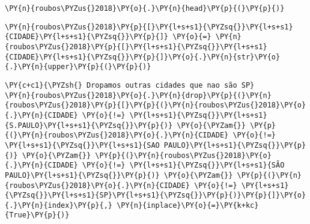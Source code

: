     \begin{tcolorbox}[breakable, size=fbox, boxrule=1pt, pad at break*=1mm,colback=cellbackground, colframe=cellborder]
\begin{Verbatim}[commandchars=\\\{\}]
\PY{n}{roubos\PYZus{}2018}\PY{o}{.}\PY{n}{head}\PY{p}{(}\PY{p}{)}
\end{Verbatim}
\end{tcolorbox}

    \begin{tcolorbox}[breakable, size=fbox, boxrule=1pt, pad at break*=1mm,colback=cellbackground, colframe=cellborder]
\begin{Verbatim}[commandchars=\\\{\}]
\PY{n}{roubos\PYZus{}2018}\PY{p}{[}\PY{l+s+s1}{\PYZsq{}}\PY{l+s+s1}{CIDADE}\PY{l+s+s1}{\PYZsq{}}\PY{p}{]} \PY{o}{=} \PY{n}{roubos\PYZus{}2018}\PY{p}{[}\PY{l+s+s1}{\PYZsq{}}\PY{l+s+s1}{CIDADE}\PY{l+s+s1}{\PYZsq{}}\PY{p}{]}\PY{o}{.}\PY{n}{str}\PY{o}{.}\PY{n}{upper}\PY{p}{(}\PY{p}{)}
\end{Verbatim}
\end{tcolorbox}

    \begin{tcolorbox}[breakable, size=fbox, boxrule=1pt, pad at break*=1mm,colback=cellbackground, colframe=cellborder]
\begin{Verbatim}[commandchars=\\\{\}]
\PY{c+c1}{\PYZsh{} Dropamos outras cidades que nao são SP}
\PY{n}{roubos\PYZus{}2018}\PY{o}{.}\PY{n}{drop}\PY{p}{(}\PY{n}{roubos\PYZus{}2018}\PY{p}{[}\PY{p}{(}\PY{n}{roubos\PYZus{}2018}\PY{o}{.}\PY{n}{CIDADE} \PY{o}{!=} \PY{l+s+s1}{\PYZsq{}}\PY{l+s+s1}{S.PAULO}\PY{l+s+s1}{\PYZsq{}}\PY{p}{)} \PY{o}{\PYZam{}} \PY{p}{(}\PY{n}{roubos\PYZus{}2018}\PY{o}{.}\PY{n}{CIDADE} \PY{o}{!=} \PY{l+s+s1}{\PYZsq{}}\PY{l+s+s1}{SAO PAULO}\PY{l+s+s1}{\PYZsq{}}\PY{p}{)} \PY{o}{\PYZam{}} \PY{p}{(}\PY{n}{roubos\PYZus{}2018}\PY{o}{.}\PY{n}{CIDADE} \PY{o}{!=} \PY{l+s+s1}{\PYZsq{}}\PY{l+s+s1}{SÃO PAULO}\PY{l+s+s1}{\PYZsq{}}\PY{p}{)} \PY{o}{\PYZam{}} \PY{p}{(}\PY{n}{roubos\PYZus{}2018}\PY{o}{.}\PY{n}{CIDADE} \PY{o}{!=} \PY{l+s+s1}{\PYZsq{}}\PY{l+s+s1}{SP}\PY{l+s+s1}{\PYZsq{}}\PY{p}{)}\PY{p}{]}\PY{o}{.}\PY{n}{index}\PY{p}{,} \PY{n}{inplace}\PY{o}{=}\PY{k+kc}{True}\PY{p}{)}
\end{Verbatim}
\end{tcolorbox}

